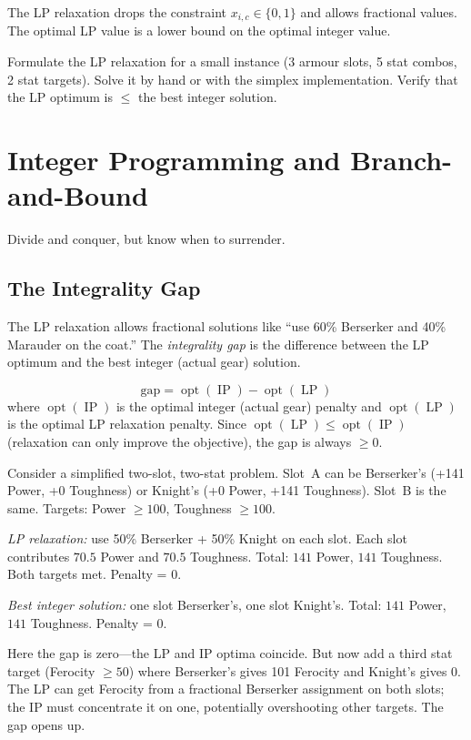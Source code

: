 \documentclass[11pt, a4paper, oneside]{book}
\newcommand{\opt}{\operatorname{opt}}
\newcommand{\LP}{\operatorname{LP}}
\newcommand{\IP}{\operatorname{IP}}
\begin{document}
The LP relaxation drops the constraint $x_{i,c} \in \{0, 1\}$ and allows
fractional values.  The optimal LP value is a lower bound on the optimal
integer value.

\begin{exercisebox}
Formulate the LP relaxation for a small instance (3 armour slots, 5 stat
combos, 2 stat targets).  Solve it by hand or with the simplex implementation.
Verify that the LP optimum is $\leq$ the best integer solution.
\end{exercisebox}

\chapter{Integer Programming and Branch-and-Bound}
\label{ch:bb}

\epigraph{Divide and conquer, but know when to surrender.}{}

\section{The Integrality Gap}

The LP relaxation allows fractional solutions like ``use 60\% Berserker and
40\% Marauder on the coat.''  The \emph{integrality gap} is the difference
between the LP optimum and the best integer (actual gear) solution.

\begin{defbox}[title={Integrality Gap}]
\[
  \text{gap} = \opt(\IP) - \opt(\LP)
\]
where $\opt(\IP)$ is the optimal integer (actual gear) penalty and $\opt(\LP)$
is the optimal LP relaxation penalty.  Since $\opt(\LP) \leq \opt(\IP)$
(relaxation can only improve the objective), the gap is always $\geq 0$.
\end{defbox}

\begin{intuitionbox}
Consider a simplified two-slot, two-stat problem.  Slot~A can be Berserker's
(+141 Power, +0 Toughness) or Knight's (+0 Power, +141 Toughness).  Slot~B
is the same.  Targets: Power $\geq 100$, Toughness $\geq 100$.

\emph{LP relaxation:} use 50\% Berserker + 50\% Knight on each slot.  Each
slot contributes $70.5$ Power and $70.5$ Toughness.  Total: $141$ Power,
$141$ Toughness.  Both targets met.  Penalty = 0.

\emph{Best integer solution:} one slot Berserker's, one slot Knight's.
Total: $141$ Power, $141$ Toughness.  Penalty = 0.

Here the gap is zero---the LP and IP optima coincide.  But now add a third
stat target (Ferocity $\geq 50$) where Berserker's gives 101 Ferocity and
Knight's gives 0.  The LP can get Ferocity from a fractional Berserker
assignment on both slots; the IP must concentrate it on one, potentially
overshooting other targets.  The gap opens up.
\end{intuitionbox}
\end{document}
